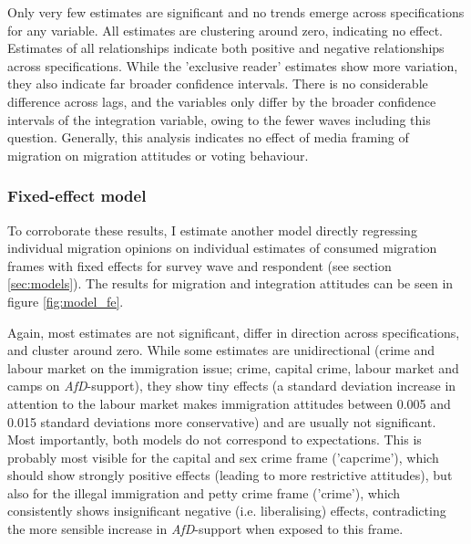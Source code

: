 \documentclass{article}
\begin{document}
Only very few estimates are significant and no trends emerge across specifications for any variable. All estimates are clustering around zero, indicating no effect. Estimates of all relationships indicate both positive and negative relationships across specifications. While the 'exclusive reader' estimates show more variation, they also indicate far broader confidence intervals. There is no considerable difference across lags, and the variables only differ by the broader confidence intervals of the integration variable, owing to the fewer waves including this question. Generally, this analysis indicates no effect of media framing of migration on migration attitudes or voting behaviour.

\subsubsection{Fixed-effect model}

To corroborate these results, I estimate another model directly regressing individual migration opinions on individual estimates of consumed migration frames with fixed effects for survey wave and respondent (see section \ref{sec:models}). The results for migration and integration attitudes can be seen in figure \ref{fig:model_fe}.

Again, most estimates are not significant, differ in direction across specifications, and cluster around zero. While some estimates are unidirectional (crime and labour market on the immigration issue; crime, capital crime, labour market and camps on \textit{AfD}-support), they show tiny effects (a standard deviation increase in attention to the labour market makes immigration attitudes between 0.005 and 0.015 standard deviations more conservative) and are usually not significant. Most importantly, both models do not correspond to expectations. This is probably most visible for the capital and sex crime frame ('capcrime'), which should show strongly positive effects (leading to more restrictive attitudes), but also for the illegal immigration and petty crime frame ('crime'), which consistently shows insignificant negative (i.e. liberalising) effects, contradicting the more sensible increase in \textit{AfD}-support when exposed to this frame.
\end{document}
